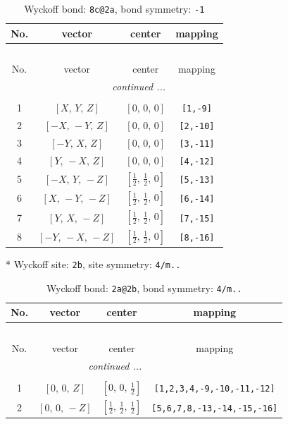 \documentclass[fleqn,8pt]{jsarticle}
\begin{document}
\renewcommand{\arraystretch}{1.2}
\begin{longtable}{cccc}
\caption{Wyckoff bond: {\tt 8c@2a}, bond symmetry: {\tt -1}}
 \\
 \hline \hline
No. & vector & center & mapping \\ \hline \endfirsthead

\multicolumn{3}{l}{\tablename\ \thetable{}} \\
 \hline \hline
No. & vector & center & mapping \\ \hline \endhead

 \hline \hline
\multicolumn{3}{r}{\footnotesize\it continued ...} \\ \endfoot

 \hline \hline
\multicolumn{3}{r}{} \\ \endlastfoot

1 & $\left[ X,\, Y,\, Z \right]$ & $\left[ 0,\, 0,\, 0 \right]$ & {\tt [1,-9]} \\ \hline
2 & $\left[ - X,\, - Y,\, Z \right]$ & $\left[ 0,\, 0,\, 0 \right]$ & {\tt [2,-10]} \\ \hline
3 & $\left[ - Y,\, X,\, Z \right]$ & $\left[ 0,\, 0,\, 0 \right]$ & {\tt [3,-11]} \\ \hline
4 & $\left[ Y,\, - X,\, Z \right]$ & $\left[ 0,\, 0,\, 0 \right]$ & {\tt [4,-12]} \\ \hline
5 & $\left[ - X,\, Y,\, - Z \right]$ & $\left[ \frac{1}{2},\, \frac{1}{2},\, 0 \right]$ & {\tt [5,-13]} \\ \hline
6 & $\left[ X,\, - Y,\, - Z \right]$ & $\left[ \frac{1}{2},\, \frac{1}{2},\, 0 \right]$ & {\tt [6,-14]} \\ \hline
7 & $\left[ Y,\, X,\, - Z \right]$ & $\left[ \frac{1}{2},\, \frac{1}{2},\, 0 \right]$ & {\tt [7,-15]} \\ \hline
8 & $\left[ - Y,\, - X,\, - Z \right]$ & $\left[ \frac{1}{2},\, \frac{1}{2},\, 0 \right]$ & {\tt [8,-16]} \\
\end{longtable}
* Wyckoff site: {\tt 2b}, site symmetry: {\tt 4/m..}
\renewcommand{\arraystretch}{1.2}
\begin{longtable}{cccc}
\caption{Wyckoff bond: {\tt 2a@2b}, bond symmetry: {\tt 4/m..}}
 \\
 \hline \hline
No. & vector & center & mapping \\ \hline \endfirsthead

\multicolumn{3}{l}{\tablename\ \thetable{}} \\
 \hline \hline
No. & vector & center & mapping \\ \hline \endhead

 \hline \hline
\multicolumn{3}{r}{\footnotesize\it continued ...} \\ \endfoot

 \hline \hline
\multicolumn{3}{r}{} \\ \endlastfoot

1 & $\left[ 0,\, 0,\, Z \right]$ & $\left[ 0,\, 0,\, \frac{1}{2} \right]$ & {\tt [1,2,3,4,-9,-10,-11,-12]} \\ \hline
2 & $\left[ 0,\, 0,\, - Z \right]$ & $\left[ \frac{1}{2},\, \frac{1}{2},\, \frac{1}{2} \right]$ & {\tt [5,6,7,8,-13,-14,-15,-16]} \\
\end{longtable}
\end{document}
